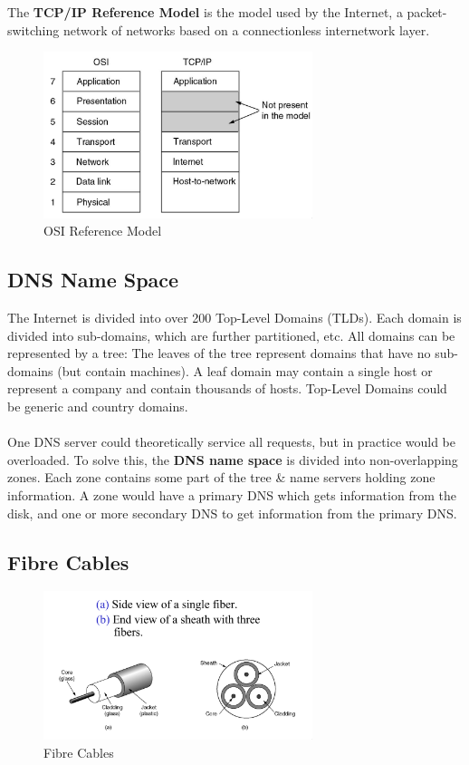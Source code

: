\documentclass[a4paper,11pt]{article}
\begin{document}
The \textbf{TCP/IP Reference Model} is the model used by the Internet, a packet-switching network of networks based on a 
connectionless internetwork layer.
\begin{figure}[h]
    \centering
    \includegraphics[width=0.7\textwidth]{./images/tcpipreferencemodel.png}
    \caption{OSI Reference Model}
\end{figure}

\subsection{DNS Name Space}
The Internet is divided into over 200 Top-Level Domains (TLDs). 
Each domain is divided into sub-domains, which are further partitioned, etc. 
All domains can be represented by a tree: The leaves of the tree represent domains that have no sub-domains (but contain
machines).
A leaf domain may contain a single host or represent a company and contain thousands of hosts.
Top-Level Domains could be generic and country domains. 
\\\\ 
One DNS server could theoretically service all requests, but in practice would be overloaded. 
To solve this, the \textbf{DNS name space} is divided into non-overlapping zones. 
Each zone contains some part of the tree \& name servers holding zone information. 
A zone would have a primary DNS which gets information from the disk, and one or more secondary DNS to get information from 
the primary DNS.

\subsection{Fibre Cables}
\begin{figure}[h]
    \centering
    \includegraphics[width=0.7\textwidth]{./images/fibrecables.png}
    \caption{Fibre Cables}
\end{figure}
\end{document}
